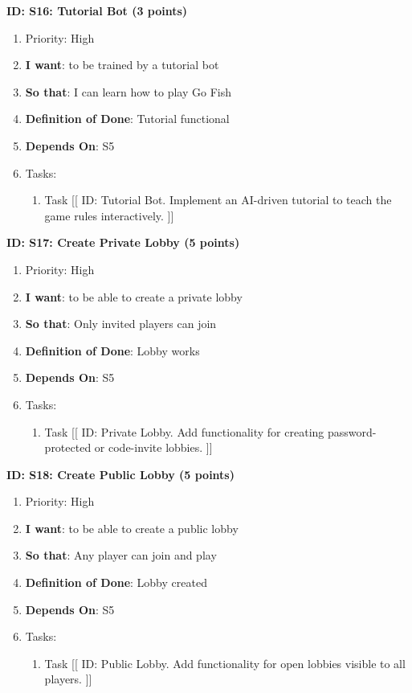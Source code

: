 \textbf{ID: S16: Tutorial Bot (3 points)}
\begin{enumerate}
    \item Priority: High
    \item \textbf{I want}: to be trained by a tutorial bot
    \item \textbf{So that}: I can learn how to play Go Fish
    \item \textbf{Definition of Done}: Tutorial functional
    \item \textbf{Depends On}: S5
    \item Tasks:
    \begin{enumerate}
        \item Task [[ ID: Tutorial Bot. Implement an AI-driven tutorial to teach the game rules interactively. ]]
    \end{enumerate}
\end{enumerate}

\textbf{ID: S17: Create Private Lobby (5 points)}
\begin{enumerate}
    \item Priority: High
    \item \textbf{I want}: to be able to create a private lobby
    \item \textbf{So that}: Only invited players can join
    \item \textbf{Definition of Done}: Lobby works
    \item \textbf{Depends On}: S5
    \item Tasks:
    \begin{enumerate}
        \item Task [[ ID: Private Lobby. Add functionality for creating password-protected or code-invite lobbies. ]]
    \end{enumerate}
\end{enumerate}

\textbf{ID: S18: Create Public Lobby (5 points)}
\begin{enumerate}
    \item Priority: High
    \item \textbf{I want}: to be able to create a public lobby
    \item \textbf{So that}: Any player can join and play
    \item \textbf{Definition of Done}: Lobby created
    \item \textbf{Depends On}: S5
    \item Tasks:
    \begin{enumerate}
        \item Task [[ ID: Public Lobby. Add functionality for open lobbies visible to all players. ]]
    \end{enumerate}
\end{enumerate}

